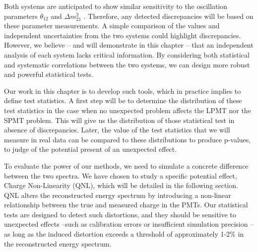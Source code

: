 \documentclass[../main.tex]{subfiles}
\begin{document}
Both systems are anticipated to show similar sensitivity to the oscillation parameters $\theta_{12}$ and $\Delta m^2_{21}$ \cite{juno_collaboration_sub-percent_2022}. Therefore, any detected discrepancies will be based on these parameter measurements. A simple comparison of the values and independent uncertainties from the two systems could highlight discrepancies. However, we believe -- and will demonstrate in this chapter -- that an independent analysis of each system lacks critical information. By considering both statistical and systematic correlations between the two systems, we can design more robust and powerful statistical tests.

Our work in this chapter is to develop such tools, which in practice implies to define test statistics. A first step will be to determine the distribution of these test statistics in the case  when no unexpected problem affects the LPMT nor the SPMT problem. This will give us the distribution of those statistical test in absence of discrepancies. Later, the value of the test statistics that we will measure in real data can be compared to these distributions to produce p-values, to judge of the potential present of an unexpected effect.

To evaluate the power of our methods, we need to simulate a concrete difference between the two spectra.
We have chosen to study a specific potential effect, Charge Non-Linearity (QNL), which will be detailed in the following section. QNL alters the reconstructed energy spectrum by introducing a non-linear relationship between the true and measured charge in the PMTs. Our statistical tests are designed to detect such distortions, and they should be sensitive to unexpected effects --such as calibration errors or insufficient simulation precision -- as long as the induced distortion exceeds a threshold of approximately 1-2\% in the reconstructed energy spectrum.
\end{document}
